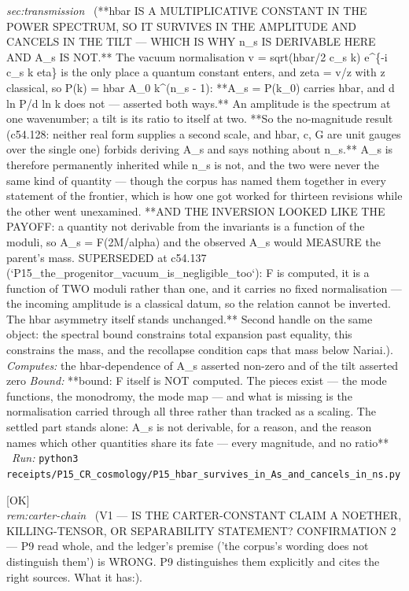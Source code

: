\begin{description}
\textit{sec:transmission} \ (**hbar IS A MULTIPLICATIVE CONSTANT IN THE POWER SPECTRUM, SO IT SURVIVES IN THE AMPLITUDE AND CANCELS IN THE TILT --- WHICH IS WHY n\_s IS DERIVABLE HERE AND A\_s IS NOT.** The vacuum normalisation v = sqrt(hbar/2 c\_s k) e\textasciicircum{}\{-i c\_s k eta\} is the only place a quantum constant enters, and zeta = v/z with z classical, so P(k) = hbar A\_0 k\textasciicircum{}(n\_s - 1): **A\_s = P(k\_0) carries hbar, and d ln P/d ln k does not --- asserted both ways.** An amplitude is the spectrum at one wavenumber; a tilt is its ratio to itself at two. **So the no-magnitude result (c54.128: neither real form supplies a second scale, and hbar, c, G are unit gauges over the single one) forbids deriving A\_s and says nothing about n\_s.** A\_s is therefore permanently inherited while n\_s is not, and the two were never the same kind of quantity --- though the corpus has named them together in every statement of the frontier, which is how one got worked for thirteen revisions while the other went unexamined. **AND THE INVERSION LOOKED LIKE THE PAYOFF: a quantity not derivable from the invariants is a function of the moduli, so A\_s = F(2M/alpha) and the observed A\_s would MEASURE the parent's mass. SUPERSEDED at c54.137 (`P15\_the\_progenitor\_vacuum\_is\_negligible\_too`): F is computed, it is a function of TWO moduli rather than one, and it carries no fixed normalisation --- the incoming amplitude is a classical datum, so the relation cannot be inverted. The hbar asymmetry itself stands unchanged.** Second handle on the same object: the spectral bound constrains total expansion past equality, this constrains the mass, and the recollapse condition caps that mass below Nariai.). 
\emph{Computes:} the hbar-dependence of A\_s asserted non-zero and of the tilt asserted zero
 \emph{Bound:} **bound: F itself is NOT computed. The pieces exist --- the mode functions, the monodromy, the mode map --- and what is missing is the normalisation carried through all three rather than tracked as a scaling. The settled part stands alone: A\_s is not derivable, for a reason, and the reason names which other quantities share its fate --- every magnitude, and no ratio**
\ \emph{Run:} \texttt{python3 receipts/P15\_CR\_cosmology/P15\_hbar\_survives\_in\_As\_and\_cancels\_in\_ns.py}
\item[\label{rcpt:V1_carter_chain}\texttt{V1\_carter\_chain}]\hfill\textsf{[OK]}\\
\textit{rem:carter-chain} \ (V1 --- IS THE CARTER-CONSTANT CLAIM A NOETHER, KILLING-TENSOR, OR SEPARABILITY STATEMENT? CONFIRMATION 2 --- P9 read whole, and the ledger's premise ('the corpus's wording does not distinguish them') is WRONG. P9 distinguishes them explicitly and cites the right sources. What it has:). 

\end{description}
